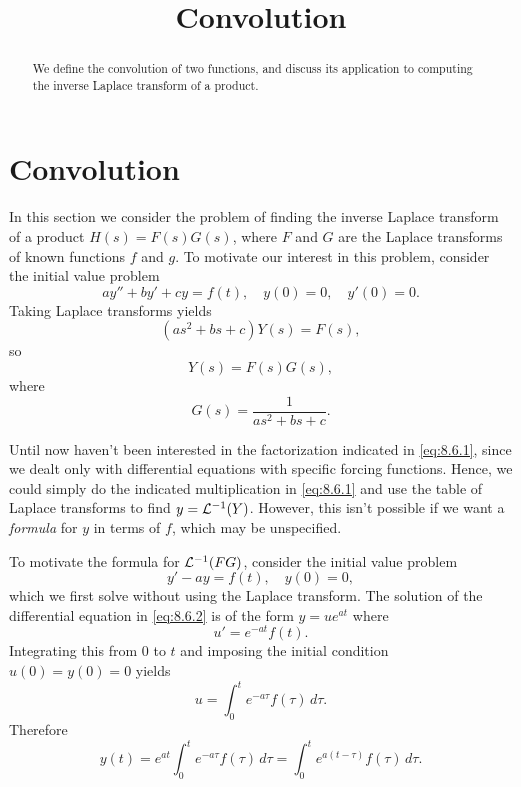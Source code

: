 \documentclass{ximera}
\title{Convolution}%
\begin{document}
\begin{abstract}
We define the convolution of two functions, and discuss its application to computing the inverse Laplace transform of a product.
\end{abstract}

\maketitle

\section*{Convolution}

In this section we consider the problem of finding the inverse Laplace
transform of a product $H(s)=F(s)G(s)$, where $F$ and $G$ are the
Laplace transforms of known functions $f$ and $g$. To motivate our
interest in this problem, consider the initial value problem
$$
ay''+by'+cy=f(t),\quad y(0)=0,\quad y'(0)=0.
$$
Taking Laplace transforms  yields
$$
(as^2+bs+c)Y(s)=F(s),
$$
so
\begin{equation}\label{eq:8.6.1}
Y(s)=F(s)G(s),
\end{equation}
where
$$
G(s)=\frac{1}{as^2+bs+c}.
$$

Until now haven't been interested in the factorization indicated
in \eqref{eq:8.6.1}, since we dealt only with differential equations
with specific forcing functions. Hence, we could simply do the
indicated multiplication in \eqref{eq:8.6.1} and use the table of Laplace
transforms to find $y={\cal L}^{-1}(Y)$. However, this isn't  possible
if we want a \textit{formula} for $y$ in terms of $f$, which may be
unspecified.

To motivate the formula for ${\cal L}^{-1}(FG)$, consider the initial
value problem
\begin{equation}\label{eq:8.6.2}
y'-ay=f(t),\quad  y(0)=0,
\end{equation}
which we first solve without using the Laplace transform.
The solution of  the differential equation in \eqref{eq:8.6.2}
is of the form $y=ue^{at}$ where
$$
u'=e^{-at}f(t).
$$
Integrating this from $0$ to $t$ and imposing the initial condition
$u(0)=y(0)=0$ yields
$$
u=\int_0^t e^{-a\tau}f(\tau)\,d\tau.
$$
Therefore
\begin{equation}\label{eq:8.6.3}
y(t)=e^{at}\int_0^t e^{-a\tau}f(\tau)\,d\tau=\int_0^t
e^{a(t-\tau)}f(\tau)\,d\tau.
\end{equation}
\end{document}
